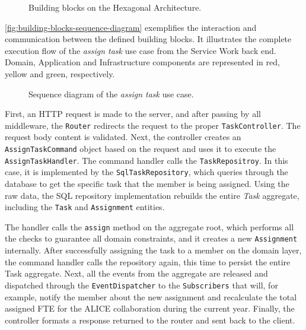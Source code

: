 \begin{figure}[htbp]
  \centering
  
  \caption{Building blocks on the Hexagonal Architecture.}
  \label{fig:building-blocks-hexagon}
\end{figure}

\autoref{fig:building-blocks-sequence-diagram} exemplifies the interaction and communication between the defined building blocks. It illustrates the complete execution flow of the \textit{assign task} use case from the Service Work back end. Domain, Application and Infrastructure components are represented in red, yellow and green, respectively.

\begin{figure}[htbp]
  \centering
  
  \caption{Sequence diagram of the \textit{assign task} use case.}
  \label{fig:building-blocks-sequence-diagram}
\end{figure}

First, an HTTP request is made to the server, and after passing by all middleware, the \texttt{Router} redirects the request to the proper \texttt{TaskController}. The request body content is validated. Next, the controller creates an \texttt{AssignTaskCommand} object based on the request and uses it to execute the \texttt{AssignTaskHandler}. The command handler calls the \texttt{TaskRepositroy}. In this case, it is implemented by the \texttt{SqlTaskRepository}, which queries through the database to get the specific task that the member is being assigned. Using the raw data, the SQL repository implementation rebuilds the entire \textit{Task} aggregate, including the \texttt{Task} and \texttt{Assignment} entities.

The handler calls the \texttt{assign} method on the aggregate root, which performs all the checks to guarantee all domain constraints, and it creates a new \texttt{Assignment} internally. After successfully assigning the task to a member on the domain layer, the command handler calls the repository again, this time to persist the entire Task aggregate. Next, all the events from the aggregate are released and dispatched through the \texttt{EventDispatcher} to the \texttt{Subscribers} that will, for example, notify the member about the new assignment and recalculate the total assigned FTE for the ALICE collaboration during the current year. Finally, the controller formats a response returned to the router and sent back to the client.
